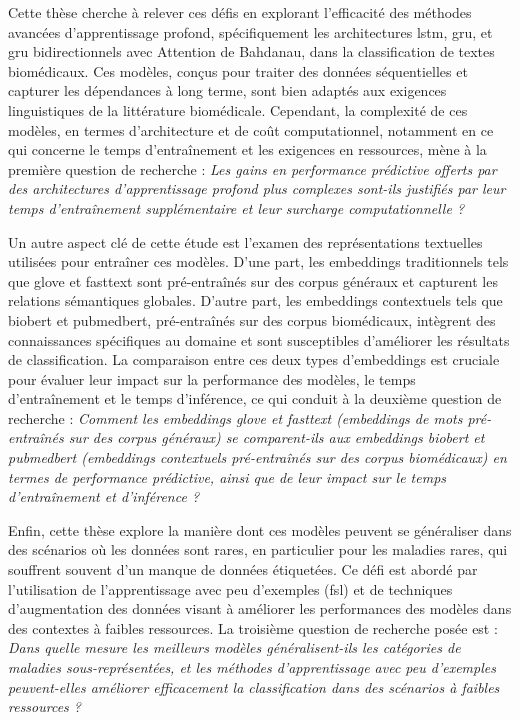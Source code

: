 \documentclass[12pt]{report}
\begin{document}
Cette thèse cherche à relever ces défis en explorant l’efficacité des méthodes avancées d’apprentissage profond, spécifiquement les architectures \gls{lstm}, \gls{gru}, et \gls{gru} bidirectionnels avec Attention de Bahdanau, dans la classification de textes biomédicaux. Ces modèles, conçus pour traiter des données séquentielles et capturer les dépendances à long terme, sont bien adaptés aux exigences linguistiques de la littérature biomédicale. Cependant, la complexité de ces modèles, en termes d’architecture et de coût computationnel, notamment en ce qui concerne le temps d’entraînement et les exigences en ressources, mène à la première question de recherche : \textit{Les gains en performance prédictive offerts par des architectures d’apprentissage profond plus complexes sont-ils justifiés par leur temps d’entraînement supplémentaire et leur surcharge computationnelle ?}

Un autre aspect clé de cette étude est l’examen des représentations textuelles utilisées pour entraîner ces modèles. D’une part, les embeddings traditionnels tels que \gls{glove} et \gls{fasttext} sont pré-entraînés sur des corpus généraux et capturent les relations sémantiques globales. D’autre part, les embeddings contextuels tels que \gls{biobert} et \gls{pubmedbert}, pré-entraînés sur des corpus biomédicaux, intègrent des connaissances spécifiques au domaine et sont susceptibles d’améliorer les résultats de classification. La comparaison entre ces deux types d’embeddings est cruciale pour évaluer leur impact sur la performance des modèles, le temps d’entraînement et le temps d’inférence, ce qui conduit à la deuxième question de recherche : \textit{Comment les embeddings \gls{glove} et \gls{fasttext} (embeddings de mots pré-entraînés sur des corpus généraux) se comparent-ils aux embeddings \gls{biobert} et \gls{pubmedbert} (embeddings contextuels pré-entraînés sur des corpus biomédicaux) en termes de performance prédictive, ainsi que de leur impact sur le temps d’entraînement et d’inférence ?}

Enfin, cette thèse explore la manière dont ces modèles peuvent se généraliser dans des scénarios où les données sont rares, en particulier pour les maladies rares, qui souffrent souvent d’un manque de données étiquetées. Ce défi est abordé par l’utilisation de l’apprentissage avec peu d’exemples (\gls{fsl}) et de techniques d’augmentation des données visant à améliorer les performances des modèles dans des contextes à faibles ressources. La troisième question de recherche posée est : \textit{Dans quelle mesure les meilleurs modèles généralisent-ils les catégories de maladies sous-représentées, et les méthodes d’apprentissage avec peu d’exemples peuvent-elles améliorer efficacement la classification dans des scénarios à faibles ressources ? } 
\end{document}
